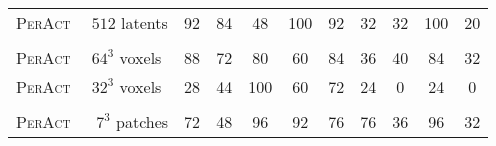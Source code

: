 \documentclass{article}
\newcommand{\model}{\textsc{PerAct}}
\begin{document}
\begin{table}[!b]
\begin{tabular}{lccccccccc}
\rowcolor[rgb]{0.9,1.0,0.9} \model~ $\phantom{0}512$ latents  & 92                                                    & 84                                                    & 48                                                         & 100                                                      & 92                                                  & 32                                                      & 32                                                  & 100                                                  & 20                                                     \\
& \multicolumn{1}{l}{}                                  & \multicolumn{1}{l}{}                                  & \multicolumn{1}{l}{}                                       & \multicolumn{1}{l}{}                                     & \multicolumn{1}{l}{}                                & \multicolumn{1}{l}{} \\[-0.6em]
\rowcolor[rgb]{0.96,0.96,1} \model~ $\phantom{0}64^3$ voxels    & 88                                                    & 72                                                    & 80                                                         & 60                                                       & 84                                                  & 36                                                      & 40                                                  & 84                                                   & 32                                                     \\
\rowcolor[rgb]{0.96,0.96,1} \model~ $\phantom{0}32^3$ voxels    & 28                                                    & 44                                                    & 100                                                        & 60                                                       & 72                                                  & 24                                                      & 0                                                   & 24                                                   & 0                                                      \\& \multicolumn{1}{l}{}                                  & \multicolumn{1}{l}{}                                  & \multicolumn{1}{l}{}                                       & \multicolumn{1}{l}{}                                     & \multicolumn{1}{l}{}                                & \multicolumn{1}{l}{} \\[-0.6em]
\rowcolor[rgb]{1.0,1.0,0.90} \model~ $\phantom{0.}7^3$ patches    & 72                                                    & 48                                                    & 96                                                         & 92                                                       & 76                                                  & 76                                                      & 36                                                  & 96                                                   & 32                                                     \\

\end{tabular}
\end{table}
\end{document}
